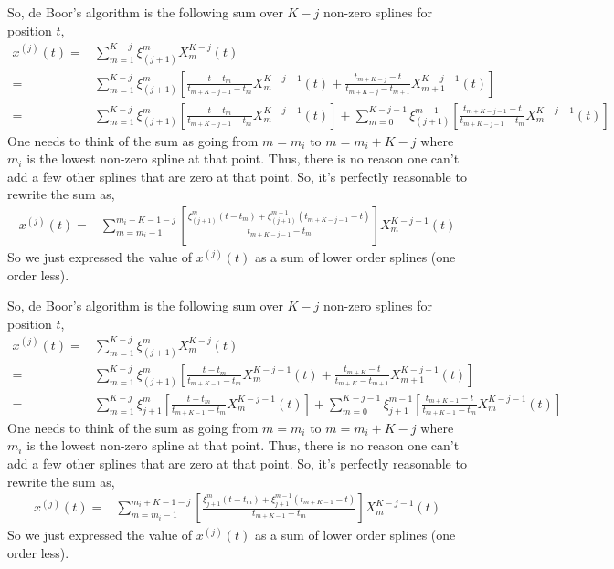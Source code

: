 \documentclass[11pt, oneside]{article}   	%
\begin{document}
So, de Boor's algorithm is the following sum over $K-j$ non-zero splines for position $t$,
\begin{align}
x^{(j)}(t) =& \sum_{m=1}^{K-j} \xi_{(j+1)}^m X^{K-j}_m(t) \\
=&  \sum_{m=1}^{K-j} \xi_{(j+1)}^m \left[ \frac{t - t_m}{t_{m+K-j-1} - t_m} X^{K-j-1}_m(t) + \frac{t_{m+K-j}-t}{t_{m+K-j} - t_{m+1}} X^{K-j-1}_{m+1}(t) \right] \\ \nonumber
=& \sum_{m=1}^{K-j} \xi_{(j+1)}^m \left[ \frac{t - t_m}{t_{m+K-j-1} - t_m} X^{K-j-1}_m(t) \right] +  \sum_{m=0}^{K-j-1} \xi_{(j+1)}^{m-1} \left[ \frac{t_{m+K-j-1}-t}{t_{m+K-j-1} - t_{m}} X^{K-j-1}_{m}(t) \right] 
\end{align}
One needs to think of the sum as going from $m=m_i$ to $m=m_i + K-j$ where $m_i$ is the lowest non-zero spline at that point. Thus, there is no reason one can't add a few other splines that are zero at that point. So, it's perfectly reasonable to rewrite the sum as,
\begin{align}
x^{(j)}(t) =& \sum_{m=m_i-1}^{m_i+K-1-j}  \left[ \frac{\xi_{(j+1)}^m(t - t_m) + \xi_{(j+1)}^{m-1} (t_{m+K-j-1}-t)  }{t_{m+K-j-1} - t_m} \right]  X^{K-j-1}_m(t)
\end{align}
So we just expressed the value of $x^{(j)}(t)$ as a sum of lower order splines (one order less).


So, de Boor's algorithm is the following sum over $K-j$ non-zero splines for position $t$,
\begin{align}
x^{(j)}(t) =& \sum_{m=1}^{K-j} \xi_{(j+1)}^m X^{K-j}_m(t) \\
=&  \sum_{m=1}^{K-j} \xi_{(j+1)}^m \left[ \frac{t - t_m}{t_{m+K-1} - t_m} X^{K-j-1}_m(t) + \frac{t_{m+K}-t}{t_{m+K} - t_{m+1}} X^{K-j-1}_{m+1}(t) \right] \\
=& \sum_{m=1}^{K-j} \xi_{j+1}^m \left[ \frac{t - t_m}{t_{m+K-1} - t_m} X^{K-j-1}_m(t) \right] +  \sum_{m=0}^{K-j-1} \xi_{j+1}^{m-1} \left[ \frac{t_{m+K-1}-t}{t_{m+K-1} - t_{m}} X^{K-j-1}_{m}(t) \right] 
\end{align}
One needs to think of the sum as going from $m=m_i$ to $m=m_i + K-j$ where $m_i$ is the lowest non-zero spline at that point. Thus, there is no reason one can't add a few other splines that are zero at that point. So, it's perfectly reasonable to rewrite the sum as,
\begin{align}
x^{(j)}(t) =& \sum_{m=m_i-1}^{m_i+K-1-j}  \left[ \frac{\xi_{j+1}^m(t - t_m) + \xi_{j+1}^{m-1} (t_{m+K-1}-t)  }{t_{m+K-1} - t_m} \right]  X^{K-j-1}_m(t)
\end{align}
So we just expressed the value of $x^{(j)}(t)$ as a sum of lower order splines (one order less).
\end{document}
